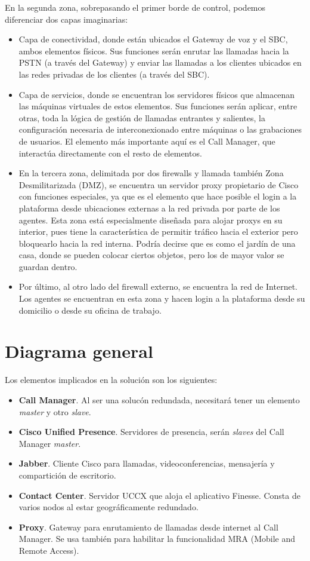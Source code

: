 \documentclass[a4paper, 12pt]{book}
\begin{document}
En la segunda zona, sobrepasando el primer borde de control, podemos diferenciar dos capas imaginarias:
\begin{itemize}
  \item Capa de conectividad, donde están ubicados el Gateway de voz y el SBC, ambos elementos físicos. Sus funciones serán enrutar las llamadas hacia la PSTN (a través del Gateway) y enviar las llamadas a los clientes ubicados en las redes privadas de los clientes (a través del SBC).
  \item Capa de servicios, donde se encuentran los servidores físicos que almacenan las máquinas virtuales de estos elementos. Sus funciones serán aplicar, entre otras, toda la lógica de gestión de llamadas entrantes y salientes, la configuración necesaria de interconexionado entre máquinas o las grabaciones de usuarios. El elemento más importante aquí es el Call Manager, que interactúa directamente con el resto de elementos.
  \item En la tercera zona, delimitada por dos firewalls y llamada también Zona Desmilitarizada (DMZ), se encuentra un servidor proxy propietario de Cisco con funciones especiales, ya que es el elemento que hace posible el login a la plataforma desde ubicaciones externas a la red privada por parte de los agentes. Esta zona está especialmente diseñada para alojar proxys en su interior, pues tiene la característica de permitir tráfico hacia el exterior pero bloquearlo hacia la red interna. Podría decirse que es como el jardín de una casa, donde se pueden colocar ciertos objetos, pero los de mayor valor se guardan dentro.
  \item Por último, al otro lado del firewall externo, se encuentra la red de Internet. Los agentes se encuentran en esta zona y hacen login a la plataforma desde su domicilio o desde su oficina de trabajo.
\end{itemize}

\section{Diagrama general}
\label{sec:diagrama}
Los elementos implicados en la solución son los siguientes:
\begin{itemize}
  \item \textbf{Call Manager}. Al ser una solucón redundada, necesitará tener un elemento \emph{master} y otro \emph{slave}.
  \item \textbf{Cisco Unified Presence}. Servidores de presencia, serán \emph{slaves} del Call Manager \emph{master}.
  \item \textbf{Jabber}. Cliente Cisco para llamadas, videoconferencias, mensajería y compartición de escritorio.
  \item \textbf{Contact Center}. Servidor UCCX que aloja el aplicativo Finesse. Consta de varios nodos al estar geográficamente redundado.
  \item \textbf{Proxy}. Gateway para enrutamiento de llamadas desde internet al Call Manager. Se usa también para habilitar la funcionalidad MRA (Mobile and Remote Access).
\end{itemize}
\end{document}

